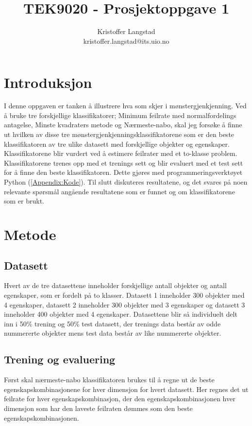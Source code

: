 \documentclass[twocolumn,norwegian]{article}
\title{TEK9020 - Prosjektoppgave 1}
\author{Kristoffer Langstad \\ kristoffer.langstad@its.uio.no}
\date{}
\begin{document}
\maketitle

\section{Introduksjon}
I denne oppgaven er tanken å illustrere hva som skjer i mønstergjenkjenning. Ved å bruke tre forskjellige klassifikatorer; Minimum feilrate med normalfordelings antagelse, Minste kvadraters metode og Nærmeste-nabo, skal jeg forsøke å finne ut hvilken av disse tre mønstergjenkjenningsklassifikatorene som er den beste klassifikatoren av tre ulike datasett med forskjellige objekter og egenskaper. Klassifikatorene blir vurdert ved å estimere feilrater med et to-klasse problem. Klassifikatorene trenes opp med et trenings sett og blir evaluert med et test sett for å finne den beste klassifikatoren. Dette gjøres med programmeringsverktøyet Python (\ref{Appendix:Kode}). Til slutt diskuteres resultatene, og det svares på noen relevante spørsmål angående resultatene som er funnet og om klassifikatorene som er brukt.


\section{Metode}
\subsection{Datasett}
Hvert av de tre datasettene inneholder forskjellige antall objekter og antall egenskaper, som er fordelt på to klasser. Datasett 1 inneholder 300 objekter med 4 egenskaper, datasett 2 inneholder 300 objekter med 3 egenskaper og datasett 3 inneholder 400 objekter med 4 egenskaper. Datasettene blir så individuelt delt inn i 50\% trening og 50\% test datasett, der trenings data består av odde nummererte objekter mens test data består av like nummererte objekter.

\subsection{Trening og evaluering}
Først skal nærmeste-nabo klassifikatoren brukes til å regne ut de beste egenskapskombinasjonene for hver dimensjon for hvert datasett. Her regnes det ut feilrate for hver egenskapskombinasjon, der den egenskapskombinasjonen hver dimensjon som har den laveste feilraten dømmes som den beste egenskapskombinasjonen. 
\end{document}
